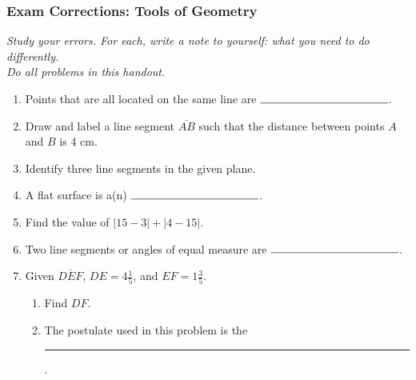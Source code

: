 \documentclass[12pt, oneside]{article}
\begin{document}
  \subsubsection*{Exam Corrections: Tools of Geometry}
  \emph{Study your errors. For each, write a note to yourself: what you need to do differently.\\ Do all problems in this handout.}
    \vspace{0.5cm}
    \begin{enumerate}
    \item Points that are all located on the same line are $\rule{4cm}{0.15mm}$.\bigskip


    \item Draw and label a line segment $\overline{AB}$ such that the distance between points $A$ and $B$ is 4 cm. \vspace{2cm}


    \item Identify three line segments in the given plane.\\[0.25in]
       \vspace{1cm}


    \item A flat surface is a(n) $\rule{4cm}{0.15mm}$. \bigskip

    \item Find the value of $|15-3|+|4-15|$. \bigskip

    \item Two line segments or angles of equal measure are $\rule{4cm}{0.15mm}$.
      \bigskip

    \item Given $\overline{DEF}$, $DE=4 \frac{1}{5}$, and $EF=1 \frac{3}{5}$.
    \begin{enumerate}
      \item Find ${DF}$.\\[.5in]
         \bigskip
      \item The postulate used in this problem is the \rule{6cm}{0.15mm}.
    \end{enumerate}


\end{enumerate}
\end{document}
